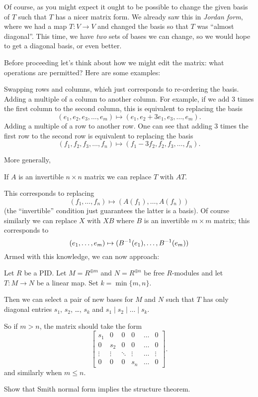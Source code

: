 Of course, as you might expect it ought to be possible to change the
given basis of $T$ such that $T$ has a nicer matrix form.
We already saw this in \emph{Jordan form},
where we had a map $T \colon V \to V$ and changed the basis
so that $T$ was ``almost diagonal''.
This time, we have \emph{two} sets of bases we can change,
so we would hope to get a diagonal basis, or even better.

Before proceeding let's think about how we might edit the matrix:
what operations are permitted?  Here are some examples:
\begin{itemize}
	\ii Swapping rows and columns, which just corresponds
	to re-ordering the basis.
	\ii Adding a multiple of a column to another column.
	For example, if we add $3$ times the first column to the second column,
	this is equivalent to replacing the basis
	\[ (e_1, e_2, e_3, \dots, e_m) \mapsto (e_1, e_2+3e_1, e_3, \dots, e_m). \]
	\ii Adding a multiple of a row to another row.
	One can see that adding $3$ times the first row to the second row
	is equivalent to replacing the basis
	\[ (f_1, f_2, f_3, \dots, f_n) \mapsto (f_1-3f_2, f_2, f_3, \dots, f_n). \]
\end{itemize}
More generally,
\begin{moral}
	If $A$ is an invertible $n \times n$ matrix we can
	replace $T$ with $AT$.
\end{moral}
This corresponds to replacing
\[ (f_1, \dots, f_n) \mapsto (A(f_1), \dots, A(f_n)) \]
(the ``invertible'' condition just guarantees the latter is a basis).
Of course similarly we can replace $X$ with $XB$
where $B$ is an invertible $m \times m$ matrix;
this corresponds to
\[ (e_1, \dots, e_m) \mapsto (B^{-1}(e_1), \dots, B^{-1}(e_m)) \]
Armed with this knowledge, we can now approach:
\begin{theorem}
	Let $R$ be a PID.
	Let $M = R^{\oplus m}$ and $N = R^{\oplus n}$ be free $R$-modules
	and let $T \colon M \to N$ be a linear map.
	Set $k = \min\{m,n\}$.

	Then we can select a pair of new bases for $M$ and $N$ such that
	$T$ has only diagonal entries $s_1$, $s_2$, \dots, $s_k$
	and $s_1 \mid s_2 \mid \dots \mid s_k$.
\end{theorem}
So if $m > n$, the matrix should take the form
\[
	\begin{bmatrix}
		s_1 & 0 & 0 & 0 & \dots & 0 \\
		0 & s_2 & 0 & 0 & \dots & 0 \\
		\vdots & \vdots & \ddots & \vdots & \dots & \vdots \\
		0 & 0 & 0 & s_n & \dots & 0
	\end{bmatrix}.
\]
and similarly when $m \le n$.
\begin{ques}
	Show that Smith normal form implies the structure theorem.
\end{ques}

